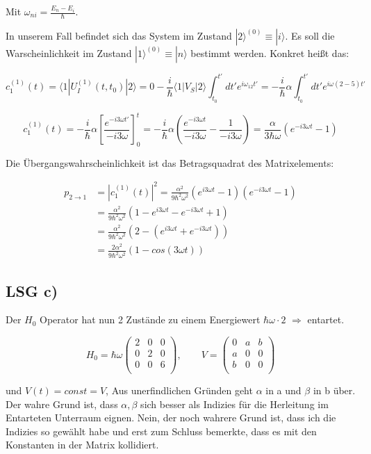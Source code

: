 Mit \(\omega_{ni} =\frac{E_n-E_i}{\hbar} \). 

In unserem Fall befindet sich das System im Zustand \(|2\rangle^{(0)} \equiv |i\rangle  \). Es soll die Warscheinlichkeit im Zustand \(|1\rangle^{(0)} \equiv |n\rangle  \) bestimmt werden. Konkret heißt das:

\[ c_1^{(1)}(t) =  \langle 1| U_I^{(1)}(t,t_0)|2\rangle = 0 - \frac{i}{\hbar}\langle 1|V_S  |2\rangle \int_{t_0}^{t'} dt' e^{i\omega_{12}t'} = - \frac{i}{\hbar}\alpha  \int_{t_0}^{t'} dt' e^{i\omega(2-5)t'}\]

\[ c_1^{(1)}(t) =  - \frac{i}{\hbar}\alpha   \left[\frac{e^{-i3\omega t'}}{-i3\omega}\right]^{t}_{0} = - \frac{i}{\hbar}\alpha (\frac{e^{-i3\omega t}}{-i3\omega}-\frac{1}{-i3\omega}) = \frac{\alpha}{3\hbar\omega} (e^{-i3\omega t}-1) \]

Die Übergangswahrscheinlichkeit ist das Betragsquadrat des Matrixelements:

\begin{align} 
p_{2 \to 1} &= |c_1^{(1)}(t)|^2 = \frac{\alpha^2}{9\hbar^2\omega^2} (e^{i3\omega t}-1)(e^{-i3\omega t}-1) \\
&= \frac{\alpha^2}{9\hbar^2\omega^2} (1-e^{i3\omega t}-e^{-i3\omega t}+1) \\
&= \frac{\alpha^2}{9\hbar^2\omega^2} (2-(e^{i3\omega t}+e^{-i3\omega t})) \\
&= \frac{2\alpha^2}{9\hbar^2\omega^2} (1-cos(3\omega t))
\end{align}

 
\subsection*{LSG c)}

Der \(H_0\) Operator hat nun 2 Zustände zu einem Energiewert \(\hbar\omega\cdot 2\) \(\Rightarrow \) entartet.

\[H_0 = \hbar\omega \begin{pmatrix}2&0&0\\ 0&2&0\\ 0&0&6\\ \end{pmatrix}, \qquad V = \begin{pmatrix}0&a&b\\ a&0&0\\ b&0&0\\ \end{pmatrix} \]

und \(V(t) = const = V\), Aus unerfindlichen Gründen geht \(\alpha\) in a und \(\beta\) in b über. Der wahre Grund ist, dass \(\alpha,\beta\) sich besser als Indizies für die Herleitung im Entarteten Unterraum eignen. Nein, der noch wahrere Grund ist, dass ich die Indizies so gewählt habe und erst zum Schluss bemerkte, dass es mit den Konstanten in der Matrix kollidiert.


